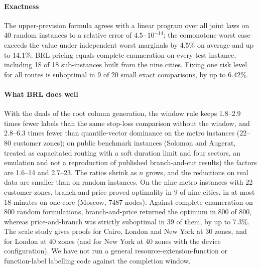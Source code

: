 \documentclass[preprint,11pt]{elsarticle}
\theoremstyle{definition}
\theoremstyle{remark}
\begin{document}
\paragraph{Exactness} The upper-prevision formula agrees with a linear program over all joint laws on 40 random instances to a relative error of $4.5\cdot10^{-14}$; the comonotone worst case exceeds the value under independent worst marginals by 4.5\% on average and up to 14.1\%. BRL pricing equals complete enumeration on every test instance, including 18 of 18 sub-instances built from the nine cities. Fixing one risk level for all routes is suboptimal in 9 of 20 small exact comparisons, by up to 6.42\%.

\paragraph{What BRL does well} With the duals of the root column generation, the window rule keeps 1.8--2.9 times fewer labels than the same stop-loss comparison without the window, and 2.8--6.3 times fewer than quantile-vector dominance on the metro instances (22--80 customer zones); on public benchmark instances (Solomon and Augerat, treated as capacitated routing with a soft duration limit and four sectors, an emulation and not a reproduction of published branch-and-cut results) the factors are 1.6--14 and 2.7--23. The ratios shrink as $n$ grows, and the reductions on real data are smaller than on random instances. On the nine metro instances with 22 customer zones, branch-and-price proved optimality in 9 of nine cities, in at most 18 minutes on one core (Moscow, 7487 nodes). Against complete enumeration on 800 random formulations, branch-and-price returned the optimum in 800 of 800, whereas price-and-branch was strictly suboptimal in 39 of them, by up to 7.3\%. The scale study gives proofs for Cairo, London and New York at 30 zones, and for London at 40 zones (and for New York at 40 zones with the device configuration). We have not run a general resource-extension-function or function-label labelling code \citep{Dabia2013} against the completion window.
\end{document}
